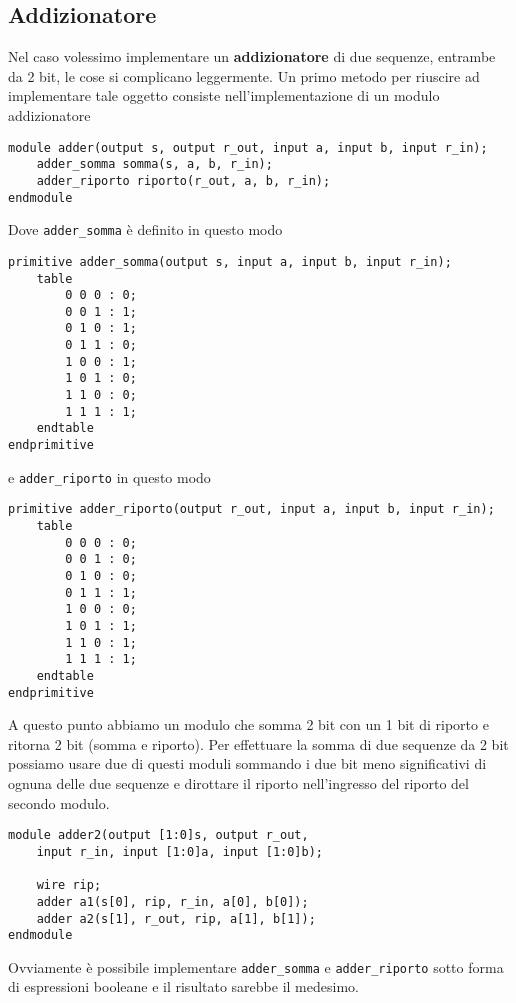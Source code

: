 \subsection{Addizionatore}
Nel caso volessimo implementare un \textbf{addizionatore} di due sequenze, entrambe da 2 bit, le
cose si complicano leggermente. Un primo metodo per riuscire ad implementare tale oggetto consiste
nell'implementazione di un modulo addizionatore
\begin{verbatim}
module adder(output s, output r_out, input a, input b, input r_in);
	adder_somma somma(s, a, b, r_in);
	adder_riporto riporto(r_out, a, b, r_in);
endmodule
\end{verbatim}
Dove \verb|adder_somma| è definito in questo modo
\begin{verbatim}
primitive adder_somma(output s, input a, input b, input r_in);
	table
		0 0 0 : 0;
		0 0 1 : 1;
		0 1 0 : 1;
		0 1 1 : 0;
		1 0 0 : 1;
		1 0 1 : 0;
		1 1 0 : 0;
		1 1 1 : 1;
	endtable
endprimitive
\end{verbatim}
e \verb|adder_riporto| in questo modo
\begin{verbatim}
primitive adder_riporto(output r_out, input a, input b, input r_in);
	table
		0 0 0 : 0;
		0 0 1 : 0;
		0 1 0 : 0;
		0 1 1 : 1;
		1 0 0 : 0;
		1 0 1 : 1;
		1 1 0 : 1;
		1 1 1 : 1;
	endtable
endprimitive
\end{verbatim}
A questo punto abbiamo un modulo che somma 2 bit con un 1 bit di riporto e ritorna 2 bit (somma e
riporto). Per effettuare la somma di due sequenze da 2 bit possiamo usare due di questi moduli
sommando i due bit meno significativi di ognuna delle due sequenze e dirottare il riporto
nell'ingresso del riporto del secondo modulo.
\begin{verbatim}
module adder2(output [1:0]s, output r_out,
	input r_in, input [1:0]a, input [1:0]b);
    
	wire rip;
    adder a1(s[0], rip, r_in, a[0], b[0]);
    adder a2(s[1], r_out, rip, a[1], b[1]);
endmodule
\end{verbatim}
Ovviamente è possibile implementare \verb|adder_somma| e \verb|adder_riporto| sotto forma di
espressioni booleane e il risultato sarebbe il medesimo.
